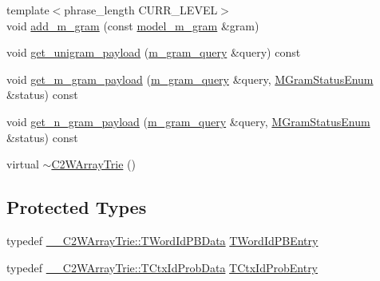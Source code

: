 \begin{DoxyCompactItemize}
\item 
{\footnotesize template$<$phrase\+\_\+length C\+U\+R\+R\+\_\+\+L\+E\+V\+E\+L$>$ }\\void \hyperlink{classuva_1_1smt_1_1bpbd_1_1server_1_1lm_1_1_c2_w_array_trie_a9643f174bc78525b255dcad7460de0f4}{add\+\_\+m\+\_\+gram} (const \hyperlink{classuva_1_1smt_1_1bpbd_1_1server_1_1lm_1_1m__grams_1_1model__m__gram}{model\+\_\+m\+\_\+gram} \&gram)
\item 
void \hyperlink{classuva_1_1smt_1_1bpbd_1_1server_1_1lm_1_1_c2_w_array_trie_a3e83abb6e59cc5b2ea1683ab089c762b}{get\+\_\+unigram\+\_\+payload} (\hyperlink{classuva_1_1smt_1_1bpbd_1_1server_1_1lm_1_1m__gram__query}{m\+\_\+gram\+\_\+query} \&query) const 
\item 
void \hyperlink{classuva_1_1smt_1_1bpbd_1_1server_1_1lm_1_1_c2_w_array_trie_a95f3c3e56d5c5a15101dd11fb9b20e9a}{get\+\_\+m\+\_\+gram\+\_\+payload} (\hyperlink{classuva_1_1smt_1_1bpbd_1_1server_1_1lm_1_1m__gram__query}{m\+\_\+gram\+\_\+query} \&query, \hyperlink{namespaceuva_1_1smt_1_1bpbd_1_1server_1_1lm_ab9b3e7382b561dcb8abcd6b55e9b796a}{M\+Gram\+Status\+Enum} \&status) const 
\item 
void \hyperlink{classuva_1_1smt_1_1bpbd_1_1server_1_1lm_1_1_c2_w_array_trie_a0859680733720ba13becb650c49591e6}{get\+\_\+n\+\_\+gram\+\_\+payload} (\hyperlink{classuva_1_1smt_1_1bpbd_1_1server_1_1lm_1_1m__gram__query}{m\+\_\+gram\+\_\+query} \&query, \hyperlink{namespaceuva_1_1smt_1_1bpbd_1_1server_1_1lm_ab9b3e7382b561dcb8abcd6b55e9b796a}{M\+Gram\+Status\+Enum} \&status) const 
\item 
virtual \hyperlink{classuva_1_1smt_1_1bpbd_1_1server_1_1lm_1_1_c2_w_array_trie_a791e16e33e7b665bd7ab5e383e8a1d92}{$\sim$\+C2\+W\+Array\+Trie} ()
\end{DoxyCompactItemize}
\subsection*{Protected Types}
\begin{DoxyCompactItemize}
\item 
typedef \hyperlink{structuva_1_1smt_1_1bpbd_1_1server_1_1lm_1_1_____c2_w_array_trie_1_1_t_word_id_p_b_data}{\+\_\+\+\_\+\+C2\+W\+Array\+Trie\+::\+T\+Word\+Id\+P\+B\+Data} \hyperlink{classuva_1_1smt_1_1bpbd_1_1server_1_1lm_1_1_c2_w_array_trie_af281f0e5bbebee6a83ad2d967656d35b}{T\+Word\+Id\+P\+B\+Entry}
\item 
typedef \hyperlink{structuva_1_1smt_1_1bpbd_1_1server_1_1lm_1_1_____c2_w_array_trie_1_1_t_ctx_id_prob_data}{\+\_\+\+\_\+\+C2\+W\+Array\+Trie\+::\+T\+Ctx\+Id\+Prob\+Data} \hyperlink{classuva_1_1smt_1_1bpbd_1_1server_1_1lm_1_1_c2_w_array_trie_ac4e86de24f58ddce661d2b5d418b4ff2}{T\+Ctx\+Id\+Prob\+Entry}
\end{DoxyCompactItemize}

